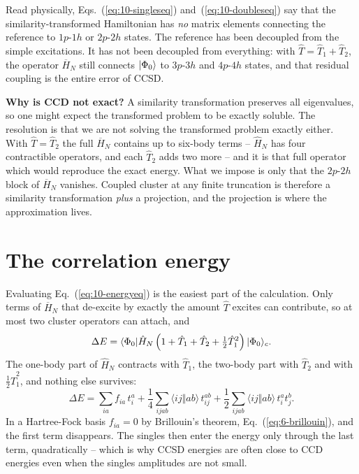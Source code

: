 Read physically, Eqs.~(\ref{eq:10-singleseq}) and~(\ref{eq:10-doubleseq}) say
that the similarity-transformed Hamiltonian has \emph{no} matrix elements
connecting the reference to $1p$-$1h$ or $2p$-$2h$ states.  The reference has
been decoupled from the simple excitations.  It has not been decoupled from
everything: with $\hat{T}=\hat{T}_1+\hat{T}_2$, the operator $\overline{H}_N$
still connects $\vert \Phi_0 \rangle$ to $3p$-$3h$ and $4p$-$4h$ states, and that
residual coupling is the entire error of CCSD.

\begin{notebox}
\textbf{Why is CCD not exact?}  A similarity transformation preserves all
eigenvalues, so one might expect the transformed problem to be exactly
soluble.  The resolution is that we are not solving the transformed problem
exactly either.  With $\hat{T}=\hat{T}_2$ the full $\overline{H}_N$ contains
up to six-body terms -- $\hat{H}_N$ has four contractible operators, and each
$\hat{T}_2$ adds two more -- and it is that full operator which would
reproduce the exact energy.  What we impose is only that the $2p$-$2h$ block
of $\overline{H}_N$ vanishes.  Coupled cluster at any finite truncation is
therefore a similarity transformation \emph{plus} a projection, and the
projection is where the approximation lives.
\end{notebox}

\section{The correlation energy}
\label{sec:ccenergy}

Evaluating Eq.~(\ref{eq:10-energyeq}) is the easiest part of the calculation.
Only terms of $\overline{H}_N$ that de-excite by exactly the amount
$\hat{T}$ excites can contribute, so at most two cluster operators can
attach, and
\begin{equation}
  \Delta E = \langle \Phi_0 | \hat{H}_N\left(1+\hat{T}_1+\hat{T}_2
    +\tfrac12\hat{T}_1^2\right) | \Phi_0 \rangle_c .
  \label{eq:10-energyterms}
\end{equation}
The one-body part of $\hat{H}_N$ contracts with $\hat{T}_1$, the two-body part
with $\hat{T}_2$ and with $\tfrac12\hat{T}_1^2$, and nothing else survives:
\begin{equation}
  \boxed{\;
  \Delta E = \sum_{ia}f_{ia}\,t_i^a
    + \frac{1}{4}\sum_{ijab}\langle ij\Vert ab\rangle\,t_{ij}^{ab}
    + \frac{1}{2}\sum_{ijab}\langle ij\Vert ab\rangle\,t_i^at_j^b .
  \;}
  \label{eq:10-ccsdenergy}
\end{equation}
In a Hartree-Fock basis $f_{ia}=0$ by Brillouin's theorem,
Eq.~(\ref{eq:6-brillouin}), and the first term disappears.  The singles then
enter the energy only through the last term, quadratically -- which is why
CCSD energies are often close to CCD energies even when the singles
amplitudes are not small.

